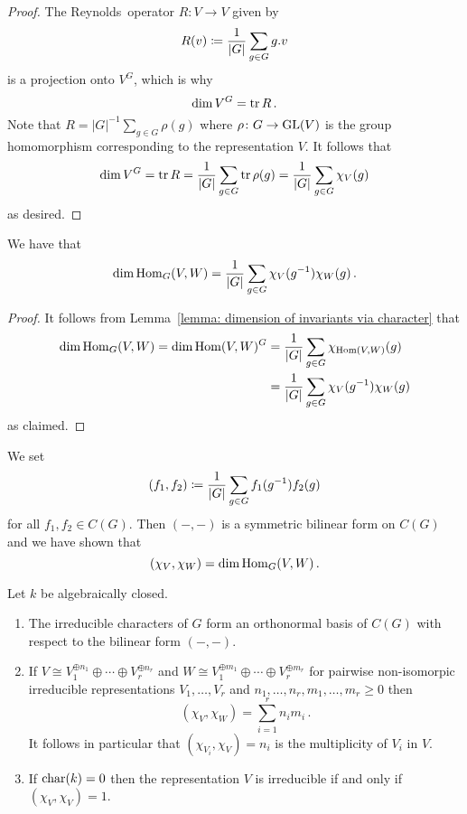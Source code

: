 \begin{proof}
  The Reynolds~operator $R \colon V \to V$ given by
  \[
              R(v)
    \coloneqq  \frac{1}{|G|} \sum_{g \in G} g.v
  \]
  is a projection onto $V^G$, which is why
  \[
      \dim V^G
    = \operatorname{tr} R \,.
  \]
  Note that $R = |G|^{-1} \sum_{g \in G} \rho(g)$ where $\rho \colon G \to \operatorname{GL}(V)$ is the group homomorphism corresponding to the representation $V$.
  It follows that
  \[
      \dim V^G
    = \operatorname{tr} R
    = \frac{1}{|G|} \sum_{g \in G} \operatorname{tr} \rho(g)
    = \frac{1}{|G|} \sum_{g \in G} \chi_V(g)
  \]
  as desired.
\end{proof}




\begin{corollary}
  \label{corollary: dim of Hom via characters}
  We have that
  \[
      \dim \operatorname{Hom}_G(V,W)
    = \frac{1}{|G|} \sum_{g \in G} \chi_V(g^{-1}) \chi_W(g) \,.
  \]
\end{corollary}


\begin{proof}
  It follows from Lemma~\ref{lemma: dimension of invariants via character} that
  \begin{align*}
        \dim \operatorname{Hom}_G(V,W)
     =  \dim \operatorname{Hom}(V,W)^G
    &=  \frac{1}{|G|} \sum_{g \in G} \chi_{\operatorname{Hom}(V,W)}(g)  \\
    &=  \frac{1}{|G|} \sum_{g \in G} \chi_V(g^{-1}) \chi_W(g)
  \end{align*}
  as claimed.
\end{proof}



\begin{fluff}
  We set
  \[
              (f_1, f_2)
    \coloneqq  \frac{1}{|G|} \sum_{g \in G} f_1(g^{-1}) f_2(g)
  \]
  for all $f_1, f_2 \in C(G)$.
  Then $(-,-)$ is a symmetric bilinear form on $C(G)$ and we have shown that
  \[
      (\chi_V, \chi_W)
    = \dim \operatorname{Hom}_G(V,W) \,.
  \]
\end{fluff}


\begin{theorem}
  Let $k$ be algebraically closed.
  \begin{enumerate}
    \item
      \label{enumerate: irred char are onb}
      The irreducible characters of $G$ form an orthonormal basis of $C(G)$ with respect to the bilinear form $(-,-)$.
    \item
      If $V \cong V_1^{\oplus n_1} \oplus \dotsb \oplus V_r^{\oplus n_r}$ and $W \cong V_1^{\oplus m_1} \oplus \dotsb \oplus V_r^{\oplus m_r}$ for pairwise non-isomorpic irreducible representations $V_1, \dotsc, V_r$ and $n_1, \dotsc, n_r, m_1, \dotsc, m_r \geq 0$ then
      \[
          (\chi_V, \chi_W)
        = \sum_{i=1}^r n_i m_i \,.
      \]
      It follows in particular that $(\chi_{V_i}, \chi_V) = n_i$ is the multiplicity of $V_i$ in $V$.
    \item
      If $\operatorname{char}(k) = 0$ then the representation $V$ is irreducible if and only if $(\chi_V, \chi_V) = 1$.
  \end{enumerate}
\end{theorem}


